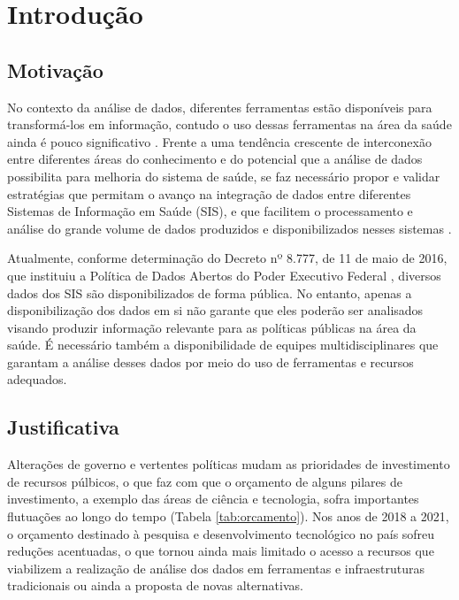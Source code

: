 
\chapter{Introdução}
\label{chap:introducao}

\section{Motivação}
\label{sec:motivacao}

No contexto da análise de dados, diferentes ferramentas estão disponíveis para transformá-los em informação, contudo o uso dessas ferramentas na área da saúde ainda é pouco significativo \cite{galvao_desafios_2019}. Frente a uma tendência crescente de interconexão entre diferentes áreas do conhecimento e do potencial que a análise de dados possibilita para melhoria do sistema de saúde, se faz necessário propor e validar estratégias que permitam o avanço na integração de dados entre diferentes Sistemas de Informação em Saúde (SIS), e que facilitem o processamento e análise do grande volume de dados produzidos e disponibilizados nesses sistemas \cite{galvao_desafios_2019,mehta_concurrence_2018}.

Atualmente, conforme determinação do Decreto nº 8.777, de 11 de maio de 2016, que instituiu a Política de Dados Abertos do Poder Executivo Federal \cite{brasildisponibilidade2016}, diversos dados dos SIS são disponibilizados de forma pública. No entanto, apenas a disponibilização dos dados em si não garante que eles poderão ser analisados visando produzir informação relevante para as políticas públicas na área da saúde. É necessário também a disponibilidade de equipes multidisciplinares que garantam a análise desses dados por meio do uso de ferramentas e recursos adequados. 

\section{Justificativa}
\label{sec:justificativa}


Alterações de governo e vertentes políticas mudam as prioridades de investimento de recursos púlbicos, o que faz com que o orçamento de alguns pilares de investimento, a exemplo das áreas de ciência e tecnologia, sofra importantes flutuações ao longo do tempo (Tabela \ref{tab:orcamento}). Nos anos de 2018 a 2021, o orçamento destinado à pesquisa e desenvolvimento tecnológico no país sofreu reduções acentuadas, o que tornou ainda mais limitado o acesso a recursos que viabilizem a realização de análise dos dados em ferramentas e infraestruturas tradicionais ou ainda a proposta de novas alternativas.

